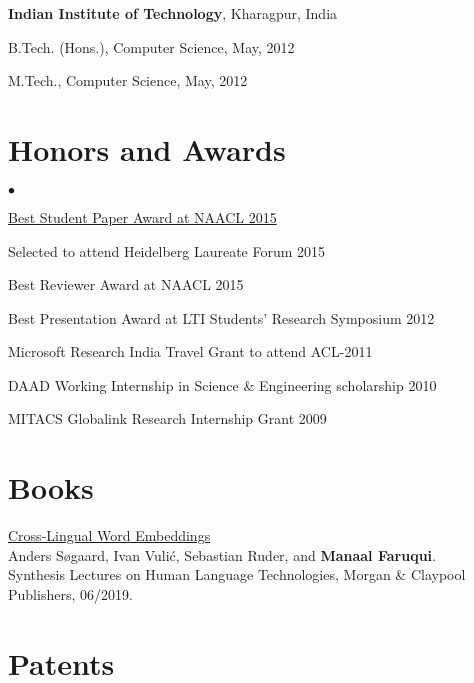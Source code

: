 \documentclass[margin,line]{res}
\newenvironment{list1}{
  \begin{list}{\ding{113}}{%
      \setlength{\itemsep}{0in}
      \setlength{\parsep}{0in} \setlength{\parskip}{0in}
      \setlength{\topsep}{0in} \setlength{\partopsep}{0in}
      \setlength{\leftmargin}{0.17in}}}{\end{list}}
\newenvironment{list2}{
  \begin{list}{$\bullet$}{%
      \setlength{\itemsep}{0in}
      \setlength{\parsep}{0in} \setlength{\parskip}{0in}
      \setlength{\topsep}{0in} \setlength{\partopsep}{0in}
      \setlength{\leftmargin}{0.2in}}}{\end{list}}
\begin{document}
\begin{resume}
{\bf Indian Institute of Technology}, Kharagpur, India\\
\vspace*{-.1in}
\begin{list1}
\item[] B.Tech. (Hons.), Computer Science,  May, 2012
\item[] M.Tech., Computer Science, May, 2012
\end{list1}

\section{\sc Honors and Awards}

\begin{list2}
\item \href{http://naacl.org/naacl-hlt-2015/best-paper-awards.html}{Best Student Paper Award at NAACL 2015}
\item Selected to attend Heidelberg Laureate Forum 2015
\item Best Reviewer Award at NAACL 2015
\item Best Presentation Award at LTI Students' Research Symposium 2012
\item Microsoft Research India Travel Grant to attend ACL-2011
\item DAAD Working Internship in Science \& Engineering scholarship 2010
\item MITACS Globalink Research Internship Grant 2009
\end{list2}

\vspace{.2cm}

\section{\sc Books}

\href{https://www.morganclaypool.com/doi/abs/10.2200/S00920ED2V01Y201904HLT042}{Cross-Lingual Word Embeddings}\\
Anders Søgaard, Ivan Vulić, Sebastian Ruder, and \textbf{Manaal Faruqui}.\\
Synthesis Lectures on Human Language Technologies, Morgan \& Claypool Publishers, 06/2019.

\section{\sc Patents}


\end{resume}
\end{document}
